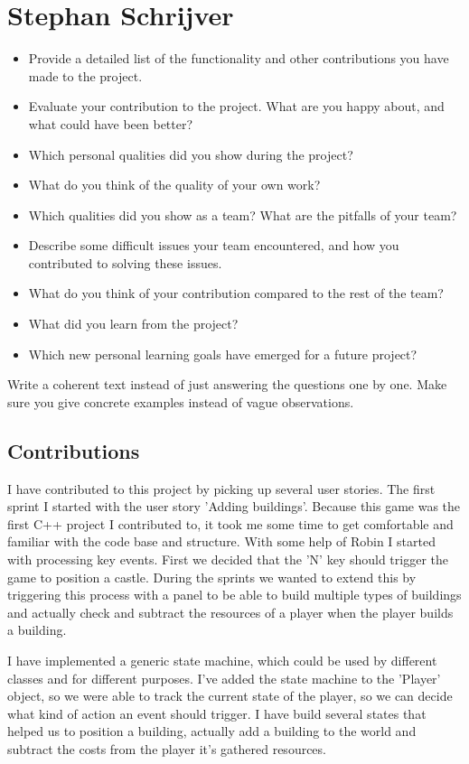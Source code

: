 \section{Stephan Schrijver}
\begin{itemize}
    \item Provide a detailed list of the functionality and other 
    contributions you have made to the project.
    \item Evaluate your contribution to the project. What are you happy 
    about, and what could have been better?
    \item Which personal qualities did you show during the project?
    \item What do you think of the quality of your own work?
    \item Which qualities did you show as a team? What are the pitfalls of your team?
    \item Describe some difficult issues your team encountered, and how you 
    contributed to solving these issues.
    \item What do you think of your contribution compared to the rest of 
    the team?
    \item What did you learn from the project?
    \item Which new personal learning goals have emerged for a future project?
\end{itemize}

Write  a  coherent  text  instead  of  just  answering  the  questions  one  by  one.   Make
sure you give concrete examples instead of vague observations.

\subsection{Contributions}
I have contributed to this project by picking up several user stories.
The first sprint I started with the user story 'Adding buildings'. Because this game was the first C++ project I contributed to, it took me some time to get comfortable and familiar with the code base and structure. With some help of Robin I started with processing key events. First we decided that the 'N' key should trigger the game to position a castle. During the sprints we wanted to extend this by triggering this process with a panel to be able to build multiple types of buildings and actually check and subtract the resources of a player when the player builds a building.

I have implemented a generic state machine, which could be used by different classes and for different purposes. I've added the state machine to the 'Player' object, so we were able to track the current state of the player, so we can decide what kind of action an event should trigger. I have build several states that helped us to position a building, actually add a building to the world and subtract the costs from the player it's gathered resources.

